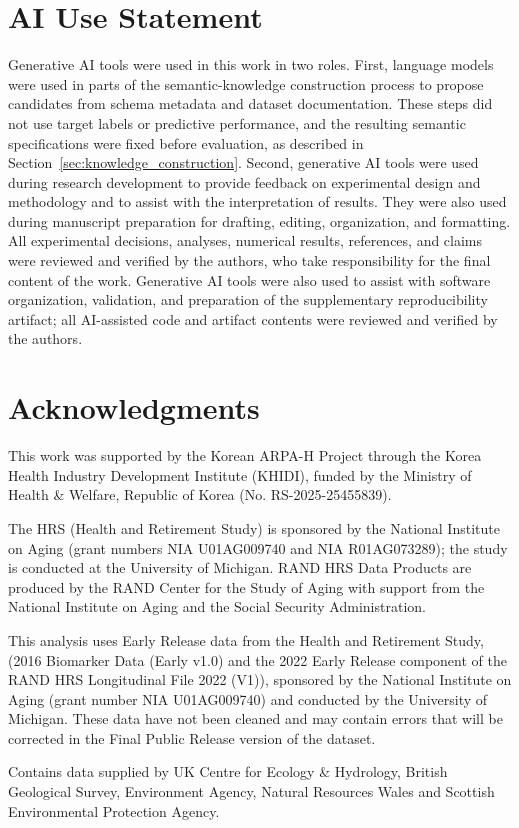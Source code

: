 \documentclass{article} %
\begin{document}
\section*{AI Use Statement}

Generative AI tools were used in this work in two roles.
First, language models were used in parts of the semantic-knowledge construction process to propose candidates from schema metadata and dataset documentation.
These steps did not use target labels or predictive performance, and the resulting semantic specifications were fixed before evaluation, as described in Section~\ref{sec:knowledge_construction}.
Second, generative AI tools were used during research development to provide feedback on experimental design and methodology and to assist with the interpretation of results.
They were also used during manuscript preparation for drafting, editing, organization, and formatting.
All experimental decisions, analyses, numerical results, references, and claims were reviewed and verified by the authors, who take responsibility for the final content of the work.
Generative AI tools were also used to assist with software organization, validation, and preparation of the supplementary reproducibility artifact; all AI-assisted code and artifact contents were reviewed and verified by the authors.

\section*{Acknowledgments}

This work was supported by the Korean ARPA-H Project through the Korea
Health Industry Development Institute (KHIDI), funded by the Ministry of
Health \& Welfare, Republic of Korea (No. RS-2025-25455839).

The HRS (Health and Retirement Study) is sponsored by the National
Institute on Aging (grant numbers NIA U01AG009740 and NIA R01AG073289);
the study is conducted at the University of Michigan.
RAND HRS Data Products are produced by the RAND Center for the Study of
Aging with support from the National Institute on Aging and the Social
Security Administration.

This analysis uses Early Release data from the Health and Retirement
Study, (2016 Biomarker Data (Early v1.0) and the 2022 Early Release
component of the RAND HRS Longitudinal File 2022 (V1)), sponsored by the
National Institute on Aging (grant number NIA U01AG009740) and conducted
by the University of Michigan. These data have not been cleaned and may
contain errors that will be corrected in the Final Public Release
version of the dataset.

Contains data supplied by UK Centre for Ecology \& Hydrology, British
Geological Survey, Environment Agency, Natural Resources Wales and
Scottish Environmental Protection Agency.




\ifdefined\ICLRIncludeAppendix

\fi
\end{document}
